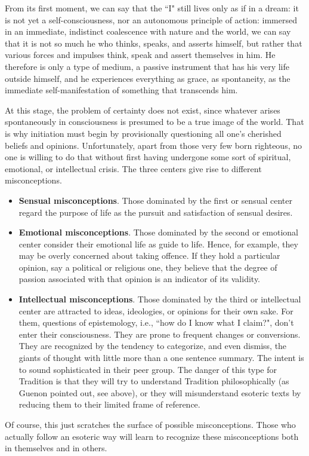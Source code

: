\begin{quotex}
From its first moment, we can say that the ``I" still lives only as if in a dream: it is not yet a self-consciousness, nor an autonomous principle of action: immersed in an immediate, indistinct coalescence with nature and the world, we can say that it is not so much he who thinks, speaks, and asserts himself, but rather that various forces and impulses think, speak and assert themselves in him. He therefore is only a type of medium, a passive instrument that has his very life outside himself, and he experiences everything as grace, as spontaneity, as the immediate self-manifestation of something that transcends him. 

\end{quotex}
At this stage, the problem of certainty does not exist, since whatever arises spontaneously in consciousness is presumed to be a true image of the world. That is why initiation must begin by provisionally questioning all one's cherished beliefs and opinions. Unfortunately, apart from those very few born righteous, no one is willing to do that without first having undergone some sort of spiritual, emotional, or intellectual crisis. The three centers give rise to different misconceptions.

\begin{itemize}
\item \textbf{Sensual misconceptions}. Those dominated by the first or sensual center regard the purpose of life as the pursuit and satisfaction of sensual desires. 
\item \textbf{Emotional misconceptions}. Those dominated by the second or emotional center consider their emotional life as guide to life. Hence, for example, they may be overly concerned about taking offence. If they hold a particular opinion, say a political or religious one, they believe that the degree of passion associated with that opinion is an indicator of its validity. 
\item \textbf{Intellectual misconceptions}. Those dominated by the third or intellectual center are attracted to ideas, ideologies, or opinions for their own sake. For them, questions of epistemology, i.e., ``how do I know what I claim?", don't enter their consciousness. They are prone to frequent changes or conversions. They are recognized by the tendency to categorize, and even dismiss, the giants of thought with little more than a one sentence summary. The intent is to sound sophisticated in their peer group. The danger of this type for Tradition is that they will try to understand Tradition philosophically (as Guenon pointed out, see above), or they will misunderstand esoteric texts by reducing them to their limited frame of reference. 
\end{itemize}
Of course, this just scratches the surface of possible misconceptions. Those who actually follow an esoteric way will learn to recognize these misconceptions both in themselves and in others.


